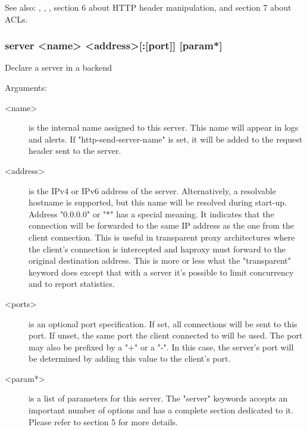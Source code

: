   See also: , , , section 6 about HTTP header
            manipulation, and section 7 about ACLs.

\subsubsection[server]{server <name> <address>[:[port]] [param*]}


  Declare a server in a backend


  Arguments:
  \begin{description}
  \item[<name>] is the internal name assigned to this server. This name will
              appear in logs and alerts.  If "http-send-server-name" is
              set, it will be added to the request header sent to the server.

  \item[<address>] is the IPv4 or IPv6 address of the server. Alternatively, a
              resolvable hostname is supported, but this name will be resolved
              during start-up. Address "0.0.0.0" or "*" has a special meaning.
              It indicates that the connection will be forwarded to the same IP
              address as the one from the client connection. This is useful in
              transparent proxy architectures where the client's connection is
              intercepted and haproxy must forward to the original destination
              address. This is more or less what the "transparent" keyword does
              except that with a server it's possible to limit concurrency and
              to report statistics.

   \item[<ports>] is an optional port specification. If set, all connections will
              be sent to this port. If unset, the same port the client
              connected to will be used. The port may also be prefixed by a "+"
              or a "-". In this case, the server's port will be determined by
              adding this value to the client's port.

  \item[<param*>] is a list of parameters for this server. The "server" keywords
              accepts an important number of options and has a complete section
              dedicated to it. Please refer to section 5 for more details.
  \end{description}

